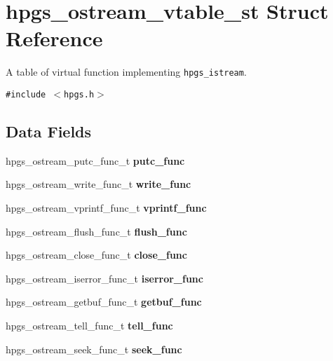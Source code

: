 \section{hpgs\_\-ostream\_\-vtable\_\-st Struct Reference}
\label{structhpgs__ostream__vtable__st}
A table of virtual function implementing {\tt hpgs\_\-istream}.  


{\tt \#include $<$hpgs.h$>$}

\subsection*{Data Fields}
\begin{CompactItemize}
\item 
hpgs\_\-ostream\_\-putc\_\-func\_\-t \textbf{putc\_\-func}\label{structhpgs__ostream__vtable__st_eaf403b461098c878dfa9334fc922cb6}

\item 
hpgs\_\-ostream\_\-write\_\-func\_\-t \textbf{write\_\-func}\label{structhpgs__ostream__vtable__st_0916e7d7f9a0e71a14b1733dbe7cc939}

\item 
hpgs\_\-ostream\_\-vprintf\_\-func\_\-t \textbf{vprintf\_\-func}\label{structhpgs__ostream__vtable__st_1548b738591c3900411c9799909aba39}

\item 
hpgs\_\-ostream\_\-flush\_\-func\_\-t \textbf{flush\_\-func}\label{structhpgs__ostream__vtable__st_a73c787fec63247c4b874e763f31631a}

\item 
hpgs\_\-ostream\_\-close\_\-func\_\-t \textbf{close\_\-func}\label{structhpgs__ostream__vtable__st_9ef986cdd5e80b125f998c8406668c51}

\item 
hpgs\_\-ostream\_\-iserror\_\-func\_\-t \textbf{iserror\_\-func}\label{structhpgs__ostream__vtable__st_ccb6a2fa7f0fab5b533660dd7a4aa38c}

\item 
hpgs\_\-ostream\_\-getbuf\_\-func\_\-t \textbf{getbuf\_\-func}\label{structhpgs__ostream__vtable__st_598a6306d72364061a0a6044315d5cfd}

\item 
hpgs\_\-ostream\_\-tell\_\-func\_\-t \textbf{tell\_\-func}\label{structhpgs__ostream__vtable__st_7f897c6353067b6d12885b8cf1dc6fb7}

\item 
hpgs\_\-ostream\_\-seek\_\-func\_\-t \textbf{seek\_\-func}\label{structhpgs__ostream__vtable__st_6534baa459ab889a28392fe32648b48f}

\end{CompactItemize}


